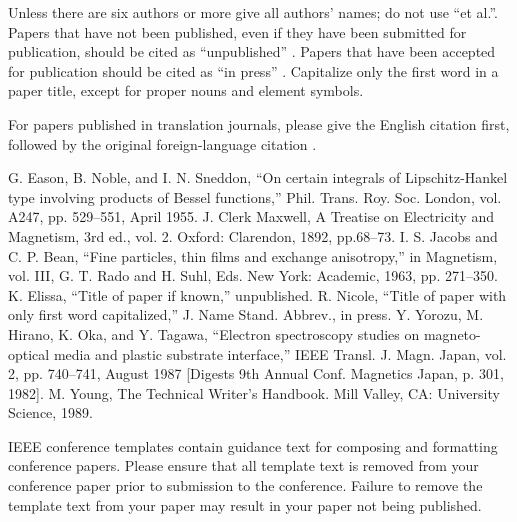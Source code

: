 \documentclass[conference]{IEEEtran}
\begin{document}
Unless there are six authors or more give all authors' names; do not use 
``et al.''. Papers that have not been published, even if they have been 
submitted for publication, should be cited as ``unpublished'' \cite{b4}. Papers 
that have been accepted for publication should be cited as ``in press'' \cite{b5}. 
Capitalize only the first word in a paper title, except for proper nouns and 
element symbols.

For papers published in translation journals, please give the English 
citation first, followed by the original foreign-language citation \cite{b6}.

\begin{thebibliography}{00}
 G. Eason, B. Noble, and I. N. Sneddon, ``On certain integrals of Lipschitz-Hankel type involving products of Bessel functions,'' Phil. Trans. Roy. Soc. London, vol. A247, pp. 529--551, April 1955.
 J. Clerk Maxwell, A Treatise on Electricity and Magnetism, 3rd ed., vol. 2. Oxford: Clarendon, 1892, pp.68--73.
 I. S. Jacobs and C. P. Bean, ``Fine particles, thin films and exchange anisotropy,'' in Magnetism, vol. III, G. T. Rado and H. Suhl, Eds. New York: Academic, 1963, pp. 271--350.
 K. Elissa, ``Title of paper if known,'' unpublished.
 R. Nicole, ``Title of paper with only first word capitalized,'' J. Name Stand. Abbrev., in press.
 Y. Yorozu, M. Hirano, K. Oka, and Y. Tagawa, ``Electron spectroscopy studies on magneto-optical media and plastic substrate interface,'' IEEE Transl. J. Magn. Japan, vol. 2, pp. 740--741, August 1987 [Digests 9th Annual Conf. Magnetics Japan, p. 301, 1982].
 M. Young, The Technical Writer's Handbook. Mill Valley, CA: University Science, 1989.
\end{thebibliography}
\vspace{12pt}
\color{red}
IEEE conference templates contain guidance text for composing and formatting conference papers. Please ensure that all template text is removed from your conference paper prior to submission to the conference. Failure to remove the template text from your paper may result in your paper not being published.
\end{document}
